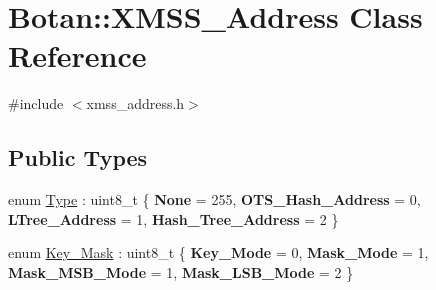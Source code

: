 \hypertarget{class_botan_1_1_x_m_s_s___address}{}\section{Botan\+:\+:X\+M\+S\+S\+\_\+\+Address Class Reference}
\label{class_botan_1_1_x_m_s_s___address}


{\ttfamily \#include $<$xmss\+\_\+address.\+h$>$}

\subsection*{Public Types}
\begin{DoxyCompactItemize}
\item 
enum \hyperlink{class_botan_1_1_x_m_s_s___address_a0101e45c5608cf312b497bf6d855000e}{Type} \+: uint8\+\_\+t \{ {\bfseries None} = 255, 
{\bfseries O\+T\+S\+\_\+\+Hash\+\_\+\+Address} = 0, 
{\bfseries L\+Tree\+\_\+\+Address} = 1, 
{\bfseries Hash\+\_\+\+Tree\+\_\+\+Address} = 2
 \}
\item 
enum \hyperlink{class_botan_1_1_x_m_s_s___address_a85146c0c3e049f62c413194049f501e3}{Key\+\_\+\+Mask} \+: uint8\+\_\+t \{ {\bfseries Key\+\_\+\+Mode} = 0, 
{\bfseries Mask\+\_\+\+Mode} = 1, 
{\bfseries Mask\+\_\+\+M\+S\+B\+\_\+\+Mode} = 1, 
{\bfseries Mask\+\_\+\+L\+S\+B\+\_\+\+Mode} = 2
 \}
\end{DoxyCompactItemize}
